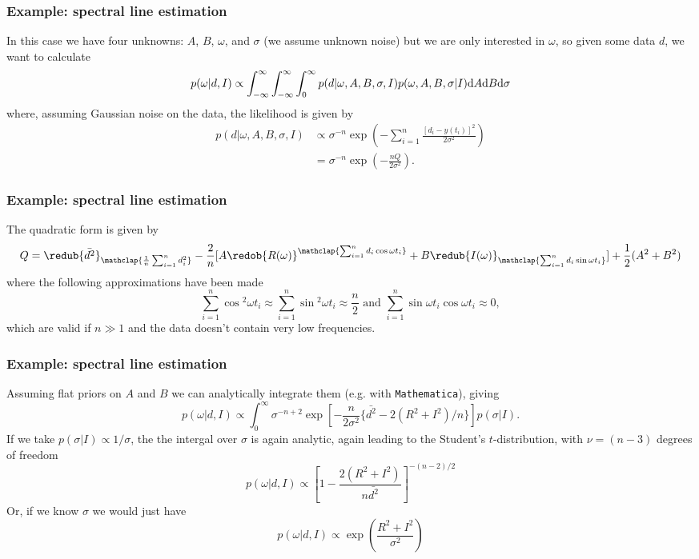 \begin{frame}

\frametitle{Example: spectral line estimation}
\label{example:spectrallineestimation}

In this case we have four unknowns: $A$, $B$, $\omega$, and $\sigma$ (we assume unknown noise) but we are only interested in $\omega$, so given some data $d$,
we want to calculate
\[
p(\omega|d,I) \propto \int_{-\infty}^{\infty}\int_{-\infty}^{\infty}\int_{0}^{\infty} p(d|\omega,A,B,\sigma,I) p(\omega,A,B,\sigma|I) {\rm d}A {\rm d}B {\rm d}\sigma
\]
where, assuming Gaussian noise on the data, the likelihood is given by
\begin{align*}
p(d|\omega,A,B,\sigma,I) &\propto \sigma^{-n}\exp{\left(-\sum_{i=1}^n\frac{[d_i-y(t_i)]^2}{2\sigma^2}\right)} \\
&= \sigma^{-n}\exp{\left(-\frac{nQ}{2\sigma^2}\right)}.
\end{align*}

\end{frame}

\begin{frame}

\frametitle{Example: spectral line estimation}
\label{example:spectrallineestimation}

The quadratic form is given by
\[
Q = \redub{\bar{d^2}}_{\mathclap{\frac{1}{n}\sum_{i=1}^n d_i^2}} - \frac{2}{n}[ A\redob{R(\omega)}^{\mathclap{\sum_{i=1}^nd_i\cos{\omega t_i}}} + B\redub{I(\omega)}_{\mathclap{\sum_{i=1}^nd_i\sin{\omega t_i}}}] + \frac{1}{2}(A^2 + B^2)
\]
where the following approximations have been made
\[
\sum_{i=1}^n \cos{}^2\omega t_i \approx  \sum_{i=1}^n \sin{}^2\omega t_i \approx \frac{n}{2} \text{ and } \sum_{i=1}^n \sin{\omega t_i}\cos{\omega t_i} \approx 0,
\]
which are valid if $n \gg 1$ and the data doesn't contain very low frequencies.

\end{frame}

\begin{frame}

\frametitle{Example: spectral line estimation}
\label{example:spectrallineestimation}

Assuming flat priors on $A$ and $B$ we can analytically integrate them (e.g. with \texttt{Mathematica}), giving
\[
p(\omega|d,I) \propto \int_0^{\infty} \sigma^{-n+2}\exp{\left[-\frac{n}{2\sigma^2}\{\bar{d^2} - 2(R^2 + I^2)/n\} \right]}p(\sigma|I).
\]
If we take $p(\sigma|I) \propto 1/\sigma$, the the intergal over $\sigma$ is again analytic, again leading to the Student's $t$-distribution, with $\nu = (n-3)$ degrees of freedom
\[
p(\omega|d,I) \propto \left[1 - \frac{2(R^2 + I^2)}{n\bar{d^2}}\right]^{-(n-2)/2}
\]
Or, if we know $\sigma$ we would just have
\[
p(\omega|d,I) \propto \exp{\left(\frac{R^2 + I^2}{\sigma^2}\right)}
\]

\end{frame}

